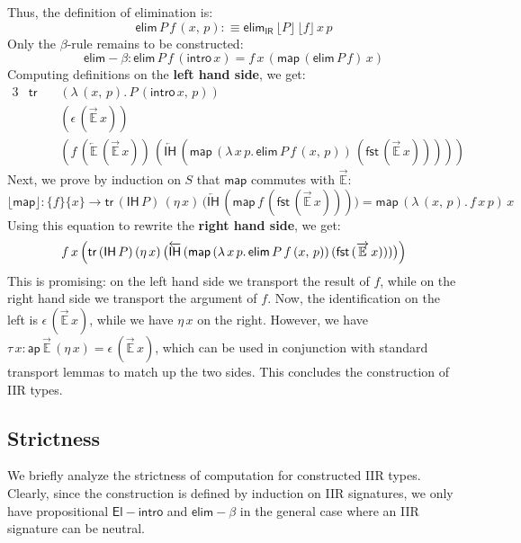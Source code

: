 \documentclass[acmsmall,screen,review,anonymous]{acmart}
\newcommand{\msf}[1]{{\mathsf{#1}}}
\newcommand{\mbb}[1]{\mathbb{#1}}
\newcommand{\IR}{\msf{IR}}
\newcommand{\intro}{\msf{intro}}
\newcommand{\IH}{\msf{IH}}
\newcommand{\map}{\msf{map}}
\newcommand{\elim}{\msf{elim}}
\newcommand{\tr}{\msf{tr}}
\newcommand{\fst}{\msf{fst}}
\newcommand{\floord}[1]{\lfloor #1 \rfloor}
\newcommand{\ora}[1]{\overrightarrow{#1}}
\newcommand{\ola}[1]{\overleftarrow{#1}}
\newcommand{\ap}{\msf{ap}}
\newcommand{\E}{\mbb{E}}
\begin{document}
Thus, the definition of elimination is:
\[ \elim\,P\,f\,(x,\,p) :\equiv \elim_\IR\,\floord{P}\,\floord{f}\,x\,p \]
Only the $\beta$-rule remains to be constructed:
\[ \elim\!-\!\!\beta : \elim\,P\,f\,(\intro\,x) = f\,x\,(\map\,(\elim\,P\,f)\,x) \]
Computing definitions on the \textbf{left hand side}, we get:
\begin{alignat*}{3}
  & \tr\, &&(\lambda\,(x,\,p).\,P\,(\intro\,x,\,p))\\
  &       &&(\epsilon\,(\ora{\E}\,x))\\
  &       &&(f\,(\ola{\E}\,(\ora{\E}\,x))\,(\ola{\IH}\,(\map\,(\lambda\,x\,p.\,\elim\,P\,f\,(x,\,p))\,(\fst\,(\ora{\E}\,x)))))
\end{alignat*}
Next, we prove by induction on $S$ that $\map$ commutes with $\ora{\E}$:
\[ \floord{\map} : \{f\}\{x\} \to \tr\,(\IH\,P)\,(\eta\,x)\,\bigl(\ola{\IH}\,(\map\,f\,(\fst\,(\ora{\E}\,x)))\bigr) = \map\,(\lambda\,(x,\,p).\,f\,x\,p)\,x \]
Using this equation to rewrite the \textbf{right hand side}, we get:
\begin{alignat*}{3}
  f\,x\,\Bigl(\tr\,(\IH\,P)\,(\eta\,x)\,\bigl(\ola{\IH}\,(\map\,(\lambda\,x\,p.\,\elim\,P\,f\,(x,\,p))\,(\fst\,(\ora{\E}\,x)))\bigr)\Bigr)
\end{alignat*}
This is promising: on the left hand side we transport the result of $f$, while on the right hand
side we transport the argument of $f$. Now, the identification on the left is
$\epsilon\,(\ora{\E}\,x)$, while we have $\eta\,x$ on the right. However, we have $\tau\,x :
\ap\,\ora{\E}\,(\eta\,x) = \epsilon\,(\ora{\E}\,x)$, which can be used in conjunction with
standard transport lemmas to match up the two sides. This concludes the construction of IIR types.

\subsection{Strictness}
We briefly analyze the strictness of computation for constructed IIR types. Clearly, since the
construction is defined by induction on IIR signatures, we only have propositional
$\msf{El\!\!-\!\!intro}$ and $\elim\!-\!\!\beta$ in the general case where an IIR signature can be
neutral.
\end{document}
